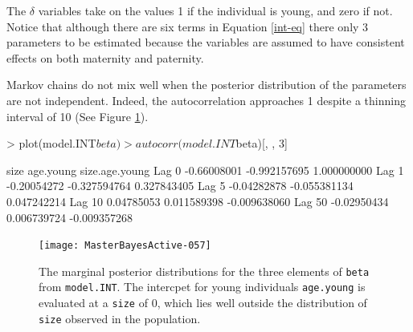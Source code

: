 \documentclass{article}
\begin{document}
The $\delta$ variables take on the values 1 if the individual is young, and zero if not.  Notice that although there are six terms in Equation \ref{int-eq} there only 3 parameters to be estimated because the variables are assumed to have consistent effects on both maternity and paternity.   


\begin{Schunk}
\end{Schunk}

Markov chains do not mix well when the posterior distribution of the parameters are not independent. Indeed, the autocorrelation approaches 1 despite a thinning interval of 10 (See Figure \ref{INT-fig}).

\begin{Schunk}
\begin{Sinput}
> plot(model.INT$beta)
> autocorr(model.INT$beta)[, , 3]
\end{Sinput}
\begin{Soutput}
              size    age.young size.age.young
Lag 0  -0.66008001 -0.992157695    1.000000000
Lag 1  -0.20054272 -0.327594764    0.327843405
Lag 5  -0.04282878 -0.055381134    0.047242214
Lag 10  0.04785053  0.011589398   -0.009638060
Lag 50 -0.02950434  0.006739724   -0.009357268
\end{Soutput}
\end{Schunk}



\begin{figure}[!h]
\begin{center}
\texttt{[image: MasterBayesActive-057]}
\end{center}
\caption{The marginal posterior distributions for the three elements of \texttt{beta} from \texttt{model.INT}.  The intercpet for young individuals \texttt{age.young} is evaluated at a \texttt{size} of 0, which lies well outside the distribution of \texttt{size} observed in the population.}
\label{INT-fig}
\end{figure}
\end{document}
